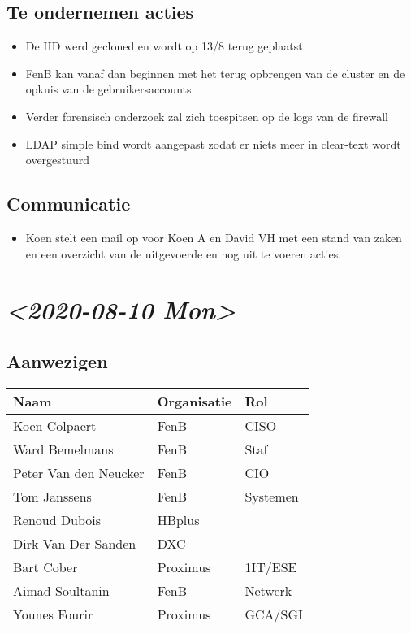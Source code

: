 \documentclass[11pt]{article}
\begin{document}
\subsection{Te ondernemen acties}
\label{sec:orgf6beb1b}
\begin{itemize}
\item De HD werd gecloned en wordt op 13/8 terug geplaatst
\item FenB kan vanaf dan beginnen met het terug opbrengen van de cluster en de opkuis van de gebruikersaccounts
\item Verder forensisch onderzoek zal zich toespitsen op de logs van de firewall
\item LDAP simple bind wordt aangepast zodat er niets meer in clear-text wordt overgestuurd
\end{itemize}

\subsection{Communicatie}
\label{sec:org68b6408}
\begin{itemize}
\item Koen stelt een mail op voor Koen A en David VH met een stand van zaken en een overzicht van de uitgevoerde en nog uit te voeren acties.
\end{itemize}

\section{\textit{<2020-08-10 Mon>}}
\label{sec:org9072340}

\subsection{Aanwezigen}
\label{sec:orge49b798}

\begin{center}
\begin{tabular}{lll}
Naam & Organisatie & Rol\\
\hline
Koen Colpaert & FenB & CISO\\
Ward Bemelmans & FenB & Staf\\
Peter Van den Neucker & FenB & CIO\\
Tom Janssens & FenB & Systemen\\
Renoud Dubois & HBplus & \\
Dirk Van Der Sanden & DXC & \\
Bart Cober & Proximus & 1IT/ESE\\
Aimad Soultanin & FenB & Netwerk\\
Younes Fourir & Proximus & GCA/SGI\\
\end{tabular}
\end{center}
\end{document}
